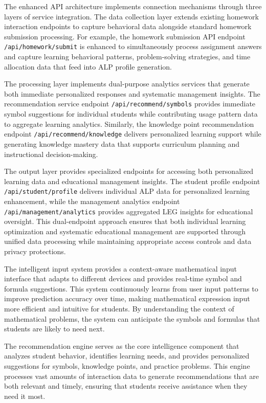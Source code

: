 \documentclass[conference]{IEEEtran}
\begin{document}
\begin{IEEEkeywords}
The enhanced API architecture implements connection mechanisms through three layers of service integration. The data collection layer extends existing homework interaction endpoints to capture behavioral data alongside standard homework submission processing. For example, the homework submission API endpoint \texttt{/api/homework/submit} is enhanced to simultaneously process assignment answers and capture learning behavioral patterns, problem-solving strategies, and time allocation data that feed into ALP profile generation.

The processing layer implements dual-purpose analytics services that generate both immediate personalized responses and systematic management insights. The recommendation service endpoint \texttt{/api/recommend/symbols} provides immediate symbol suggestions for individual students while contributing usage pattern data to aggregate learning analytics. Similarly, the knowledge point recommendation endpoint \texttt{/api/recommend/knowledge} delivers personalized learning support while generating knowledge mastery data that supports curriculum planning and instructional decision-making.

The output layer provides specialized endpoints for accessing both personalized learning data and educational management insights. The student profile endpoint \texttt{/api/student/profile} delivers individual ALP data for personalized learning enhancement, while the management analytics endpoint \texttt{/api/management/analytics} provides aggregated LEG insights for educational oversight. This dual-endpoint approach ensures that both individual learning optimization and systematic educational management are supported through unified data processing while maintaining appropriate access controls and data privacy protections.

The intelligent input system provides a context-aware mathematical input interface that adapts to different devices and provides real-time symbol and formula suggestions. This system continuously learns from user input patterns to improve prediction accuracy over time, making mathematical expression input more efficient and intuitive for students. By understanding the context of mathematical problems, the system can anticipate the symbols and formulas that students are likely to need next.

The recommendation engine serves as the core intelligence component that analyzes student behavior, identifies learning needs, and provides personalized suggestions for symbols, knowledge points, and practice problems. This engine processes vast amounts of interaction data to generate recommendations that are both relevant and timely, ensuring that students receive assistance when they need it most.


\end{IEEEkeywords}
\end{document}
